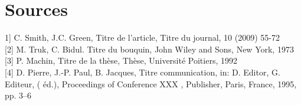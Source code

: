 \documentclass{article}
\begin{document}
\section*{Sources}
\noindent{[}1] C. Smith, J.C. Green, Titre de l’article, Titre du journal, 10 (2009) 55-72\\
{[}2] M. Truk, C. Bidul. Titre du bouquin, John Wiley and Sons, New York, 1973\\
{[}3] P. Machin, Titre de la thèse, Thèse, Université Poitiers, 1992\\
{[}4] D. Pierre, J.-P. Paul, B. Jacques, Titre communication, in: D. Editor, G. Editeur, ( éd.), Proceedings of Conference XXX , Publisher, Paris, France, 1995, pp. 3–6
\end{document}
